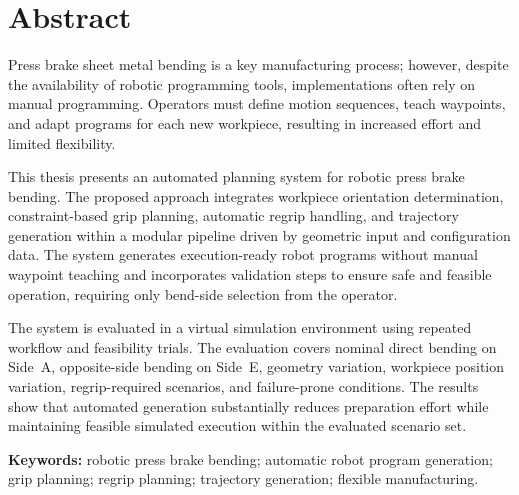\chapter*{Abstract}

Press brake sheet metal bending is a key manufacturing process; however, despite the availability of robotic programming tools, implementations often rely on manual programming. Operators must define motion sequences, teach waypoints, and adapt programs for each new workpiece, resulting in increased effort and limited flexibility.

This thesis presents an automated planning system for robotic press brake bending. The proposed approach integrates workpiece orientation determination, constraint-based grip planning, automatic regrip handling, and trajectory generation within a modular pipeline driven by geometric input and configuration data. The system generates execution-ready robot programs without manual waypoint teaching and incorporates validation steps to ensure safe and feasible operation, requiring only bend-side selection from the operator.

The system is evaluated in a virtual simulation environment using repeated workflow and feasibility trials. The evaluation covers nominal direct bending on Side~A, opposite-side bending on Side~E, geometry variation, workpiece position variation, regrip-required scenarios, and failure-prone conditions. The results show that automated generation substantially reduces preparation effort while maintaining feasible simulated execution within the evaluated scenario set.

\vspace{1em}
\noindent\textbf{Keywords:} robotic press brake bending; automatic robot program generation; grip planning; regrip planning; trajectory generation; flexible manufacturing.
